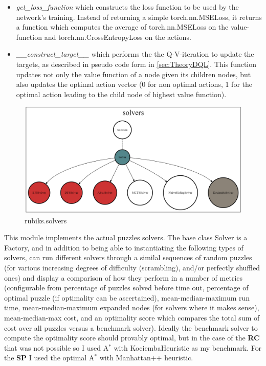 \begin{itemize}
\begin{itemize}
\item \textit{get\_loss\_function} which constructs the loss function to be used by the network's training. Instead of returning a simple torch.nn.MSELoss, it returns a function which computes the average of torch.nn.MSELoss on the value-function and torch.nn.CrossEntropyLoss on the actions.
\item \textit{\_\_construct\_target\_\_} which performs the the Q-V-iteration to update the targets, as described in pseudo code form in \ref{sec:TheoryDQL}. This function updates not only the value function of a node given its children nodes, but also updates the optimal action vector (0 for non optimal actions, 1 for the optimal action leading to the child node of highest value function).
\end{itemize} 


\end{itemize}


\label{sec:codesolvers}
\begin{figure}[H]
\centering
\includegraphics[scale=0.22]{./Figures/codebasesolvers}
\caption[Codebase]{rubiks.solvers}
\label{fig:Codebasesolvers}
\end{figure}
This module implements the actual puzzles solvers. The base class Solver is a Factory, and in addition to being able to instantiating the following types of solvers, can run different solvers through a similal sequences of random puzzles (for various increasing degrees of difficulty (scrambling), and/or perfectly shuffled ones) and display a comparison of how they perform in a number of metrics (configurable from percentage of puzzles solved before time out, percentage of optimal puzzle (if optimality can be ascertained), mean-median-maximum run time, mean-median-maximum expanded nodes (for solvers where it makes sense), mean-median-max cost, and an optimality score which compares the total sum of cost over all puzzles versus a benchmark solver). Ideally the benchmark solver to compute the optimality score should provably optimal, but in the case of the \textbf{RC} that was not possible so I used A$^{*}$ with KociembaHeuristic as my benchmark. For the \textbf{SP} I used the optimal A$^{*}$ with Manhattan++ heuristic.

